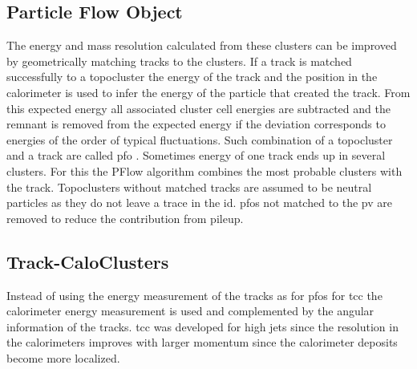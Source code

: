 \subsection{Particle Flow Object}
The energy and mass resolution calculated from these clusters can be improved by geometrically matching tracks to the clusters. If a track is matched successfully to a topocluster the energy of the track and the position in the calorimeter is used to infer the energy of the particle that created the track. From this expected energy all associated cluster cell energies are subtracted and the remnant is removed from the expected energy if the deviation corresponds to energies of the order of typical fluctuations. Such combination of a topocluster and a track are called \ac{pfo} \citep{aaboud2017jet}. Sometimes energy of one track ends up in several clusters. For this the PFlow algorithm combines the most probable clusters with the track. Topoclusters without matched tracks are assumed to be neutral particles as they do not leave a trace in the \ac{id}. \ac{pfo}s not matched to the \ac{pv} are removed to reduce the contribution from pileup.

\subsection{Track-CaloClusters}
Instead of using the energy measurement of the tracks as for \acp{pfo} for \ac{tcc} the calorimeter energy measurement is used and complemented by the angular information of the tracks. \ac{tcc} was developed for high \pt jets since the resolution in the calorimeters improves with larger momentum since the calorimeter deposits become more localized.
 


